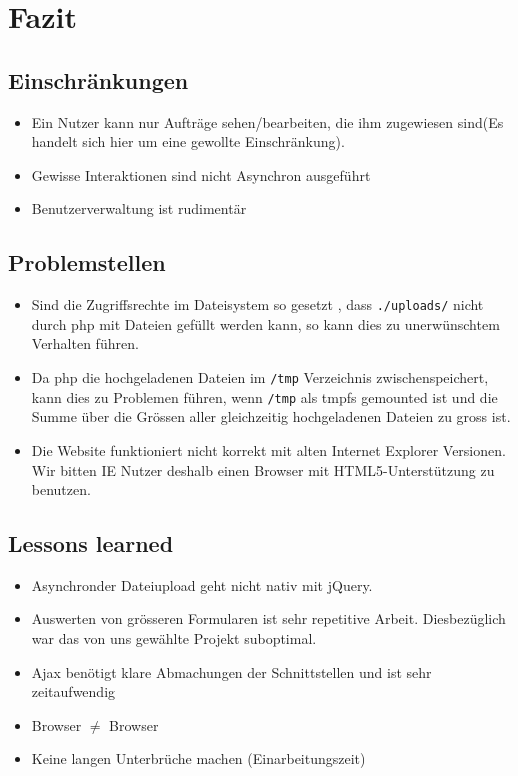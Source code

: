 \documentclass[ngerman, 12pt, pdftex]{scrartcl}[2006/07/30]
\begin{document}

\section{Fazit}
\subsection{Einschränkungen}
\begin{itemize}
\item Ein Nutzer kann nur Aufträge sehen/bearbeiten, die ihm zugewiesen sind(Es handelt sich hier um eine gewollte Einschränkung).
\item Gewisse Interaktionen sind nicht Asynchron ausgeführt
\item Benutzerverwaltung ist rudimentär
\end{itemize}


\subsection{Problemstellen}
\begin{itemize}
\item Sind die Zugriffsrechte im Dateisystem so gesetzt , dass \verb+./uploads/+ nicht durch php mit Dateien gefüllt werden kann, so kann dies zu unerwünschtem Verhalten führen.
\item Da php die hochgeladenen Dateien im \verb+/tmp+ Verzeichnis zwischenspeichert, kann dies zu Problemen führen, wenn \verb+/tmp+ als tmpfs gemounted ist und die Summe über die Grössen aller gleichzeitig hochgeladenen Dateien zu gross ist.
\item Die Website funktioniert nicht korrekt mit alten Internet Explorer Versionen. Wir bitten IE Nutzer deshalb einen Browser mit HTML5-Unterstützung zu benutzen.

\end{itemize}
\subsection{Lessons learned}
\begin{itemize}
\item Asynchronder Dateiupload geht nicht nativ mit jQuery.
\item Auswerten von grösseren Formularen ist sehr repetitive Arbeit. Diesbezüglich war das von uns gewählte Projekt suboptimal.
\item Ajax benötigt klare Abmachungen der Schnittstellen und ist sehr zeitaufwendig
\item Browser $\neq$ Browser
\item Keine langen Unterbrüche machen (Einarbeitungszeit)
\end{itemize}


\end{document}
